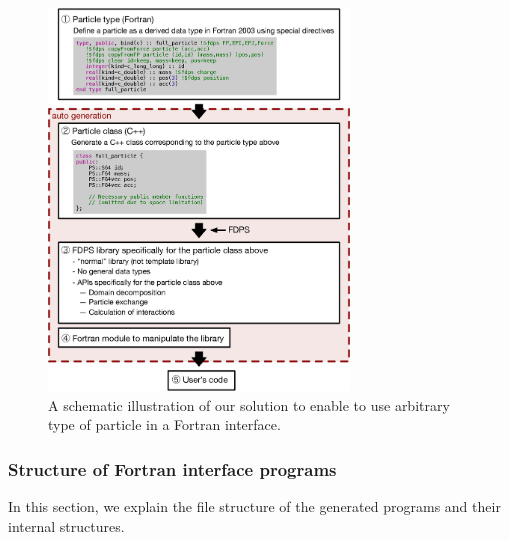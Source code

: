 \documentclass[twocolumn,useamsfonts]{pasj01}
\begin{document}
\begin{figure}[h]
\begin{center}
\includegraphics[width=8cm]{figures/our_solution}
\end{center}
\caption{A schematic illustration of our solution to enable to use arbitrary type of particle in a Fortran interface.}
\label{fig:our_solution}  
\end{figure}

\subsubsection{Structure of Fortran interface programs}
\label{subsubsec:ftn_if_str}
In this section, we explain the file structure of the generated programs and their internal structures.
\end{document}
